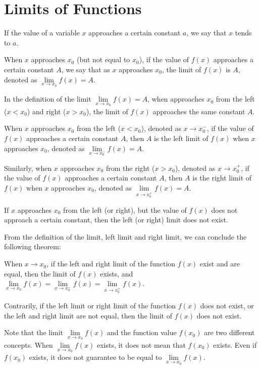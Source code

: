 \documentclass[12pt]{report}
\begin{document}
\section{Limits of Functions}

If the value of a variable $x$ approaches a certain constant $a$, we say that
$x$ tends to $a$.

When $x$ approaches $x_0$ (but not equal to $x_0$), if the value of $f (x)$
approaches a certain constant $A$, we say that as $x$ approaches $x_0$, the
limit of $f (x)$ is $A$, denoted as $\lim\limits_{x \to x_0} f (x) = A$.

In the definition of the limit $\lim\limits_{x \to x_0} f (x) = A$, when
approaches $x_0$ from the left ($x < x_0$) and right ($x > x_0$), the limit of
$f (x)$ approaches the same constant $A$.

When $x$ approaches $x_0$ from the left ($x < x_0$), denoted as $x \to x_0^-$,
if the value of $f (x)$ approaches a certain constant $A$, then $A$ is the left
limit of $f (x)$ when $x$ approaches $x_0$, denoted as $\lim\limits_{x \to
    x_0^-} f (x) = A$.

Similarly, when $x$ approaches $x_0$ from the right ($x > x_0$), denoted as $x
  \to x_0^+$, if the value of $f (x)$ approaches a certain constant $A$, then $A$
is the right limit of $f (x)$ when $x$ approaches $x_0$, denoted as
$\lim\limits_{x \to x_0^+} f (x) = A$.

If $x$ approaches $x_0$ from the left (or right), but the value of $f (x)$ does
not approach a certain constant, then the left (or right) limit does not exist.

From the definition of the limit, left limit and right limit, we can conclude
the following theorem:
\begin{mdframed}[style=MyFrame]
  When $x \to x_0$, if the left and right limit of the function $f (x)$ exist and are equal, then the limit of $f (x)$ exists, and $\lim\limits_{x \to x_0} f (x) = \lim\limits_{x \to x_0^-} f (x) = \lim\limits_{x \to x_0^+} f (x)$.

  Contrarily, if the left limit or right limit of the function $f (x)$ does not
  exist, or the left and right limit are not equal, then the limit of $f (x)$
  does not exist.
\end{mdframed}

Note that the limit $\lim\limits_{x \to x_0} f (x)$ and the function value $f
  (x_0)$ are two different concepts. When $\lim\limits_{x \to x_0} f (x)$ exists,
it does not mean that $f (x_0)$ exists. Even if $f (x_0)$ exists, it does not
guarantee to be equal to $\lim\limits_{x \to x_0} f (x)$.
\end{document}
